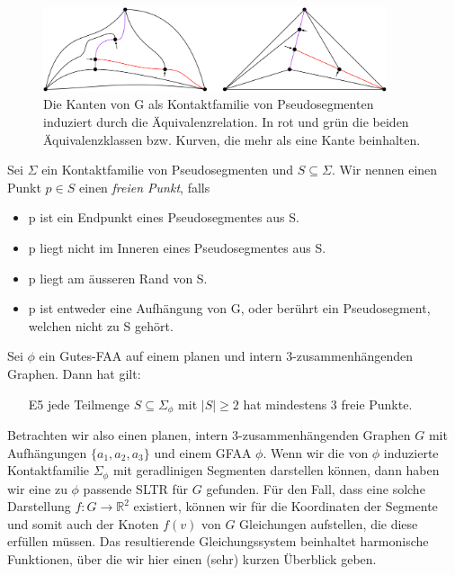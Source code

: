 \begin{figure}[h]
	\centering
  \includegraphics[width=0.9\textwidth]{pseudo_seg.png}
  \caption{Die Kanten von G als Kontaktfamilie von Pseudosegmenten induziert durch die Äquivalenzrelation. In rot und grün die beiden Äquivalenzklassen bzw. Kurven, die mehr als eine Kante beinhalten.}
\end{figure}

\begin{definition}
Sei $\Sigma$ ein Kontaktfamilie von Pseudosegmenten und $S\subseteq\Sigma$. Wir nennen einen Punkt $p\in S$ einen \textit{freien Punkt}, falls
\begin{itemize}
\item p ist ein Endpunkt eines Pseudosegmentes aus S.
\item p liegt nicht im Inneren eines Pseudosegmentes aus S.
\item p liegt am äusseren Rand von S.
\item p ist entweder eine Aufhängung von G, oder berührt ein Pseudosegment, welchen nicht zu S gehört.
\end{itemize} 
\end{definition}

\begin{lemma}\cite[Lemma 2.8]{af13}\label{lemma_af13}
Sei $\phi$ ein Gutes-FAA auf einem planen und intern 3-zusammenhängenden Graphen. Dann hat gilt: 
\begin{itemize}
\item [E5] jede Teilmenge $S \subseteq \Sigma_{\phi}$ mit $|S| \geq 2$ hat mindestens 3 freie Punkte.
\end{itemize}
\end{lemma}

Betrachten wir also einen planen, intern 3-zusammenhängenden Graphen $G$ mit Aufhängungen $\{a_1,a_2,a_3\}$ und einem GFAA $\phi$. Wenn wir die von $\phi$ induzierte Kontaktfamilie $\Sigma_{\phi}$ mit geradlinigen Segmenten darstellen können, dann haben wir eine zu $\phi$ passende SLTR für $G$ gefunden. Für den Fall, dass eine solche Darstellung $f:G\to\mathbb{R}^2$ existiert, können wir für die Koordinaten der Segmente und somit auch der Knoten $f(v)$ von $G$ Gleichungen aufstellen, die diese erfüllen müssen. Das resultierende Gleichungssystem beinhaltet harmonische Funktionen, über die wir hier einen (sehr) kurzen Überblick geben. 

